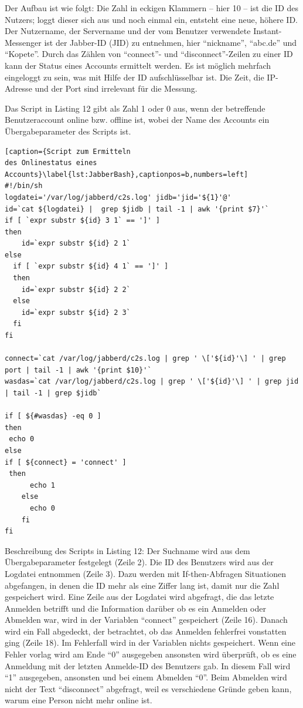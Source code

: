 \documentclass[12pt,ngerman,toc=listofnumbered,toc=bibliographynumbered,toc=index,headsepline=true]{scrbook}
\begin{document}
Der Aufbau ist wie folgt: Die Zahl in eckigen Klammern -- hier 10 -- ist die ID
des Nutzers; loggt dieser sich aus und noch einmal ein, entsteht eine neue, höhere
ID. Der Nutzername, der Servername und der vom Benutzer verwendete
Instant-Messenger ist der Jabber-ID (JID) zu entnehmen, hier 
\enquote{nickname}, \enquote{abc.de} und \enquote{Kopete}. Durch das Zählen von 
\enquote{connect}- und \enquote{disconnect}-Zeilen zu einer ID kann der Status
eines Accounts ermittelt werden. Es ist möglich mehrfach eingeloggt zu sein, was
mit Hilfe der ID aufschlüsselbar ist. Die Zeit, die IP-Adresse und der Port sind
irrelevant für die Messung. %

Das Script in Listing 12 gibt als Zahl 1 oder 0 aus, wenn der betreffende
Benutzeraccount online bzw. offline ist, wobei der Name des Accounts ein
Übergabeparameter des Scripts ist.

\begin{lstlisting}[caption={Script zum Ermitteln
des Onlinestatus eines
Accounts}\label{lst:JabberBash},captionpos=b,numbers=left]
#!/bin/sh
logdatei='/var/log/jabberd/c2s.log' jidb='jid='${1}'@' 
id=`cat ${logdatei} |  grep $jidb | tail -1 | awk '{print $7}'` 
if [ `expr substr ${id} 3 1` == ']' ] 
then 
    id=`expr substr ${id} 2 1` 
else 
  if [ `expr substr ${id} 4 1` == ']' ] 
  then 
    id=`expr substr ${id} 2 2` 
  else 
    id=`expr substr ${id} 2 3` 
  fi 
fi 

connect=`cat /var/log/jabberd/c2s.log | grep ' \['${id}'\] ' | grep port | tail -1 | awk '{print $10}'` 
wasdas=`cat /var/log/jabberd/c2s.log | grep ' \['${id}'\] ' | grep jid | tail -1 | grep $jidb` 

if [ ${#wasdas} -eq 0 ] 
then 
 echo 0 
else 
if [ ${connect} = 'connect' ] 
 then 
      echo 1 
    else 
      echo 0 
    fi 
fi
\end{lstlisting}

Beschreibung des Scripts in Listing 12: Der Suchname wird aus dem
Übergabeparameter festgelegt (Zeile 2). Die ID des Benutzers wird aus der
Logdatei entnommen (Zeile 3). Dazu werden mit If-then-Abfragen Situationen
abgefangen, in denen die ID mehr als eine Ziffer lang ist, damit nur die Zahl
gespeichert wird. Eine Zeile aus der Logdatei wird abgefragt, die das letzte
Anmelden betrifft und die Information darüber ob es ein Anmelden oder Abmelden
war, wird in der Variablen \enquote{connect} gespeichert (Zeile 16). Danach wird
ein Fall abgedeckt, der betrachtet, ob das Anmelden fehlerfrei vonstatten ging
(Zeile 18). Im Fehlerfall wird in der Variablen nichts gespeichert. Wenn eine
Fehler vorlag wird am Ende \enquote{0} ausgegeben ansonsten wird überprüft, ob
es eine Anmeldung mit der letzten Anmelde-ID des Benutzers gab. In diesem Fall
wird \enquote{1} ausgegeben, ansonsten und bei einem Abmelden \enquote{0}. Beim
Abmelden wird nicht der Text \enquote{disconnect} abgefragt, weil es
verschiedene Gründe geben kann, warum eine Person nicht mehr online ist.
\end{document}

